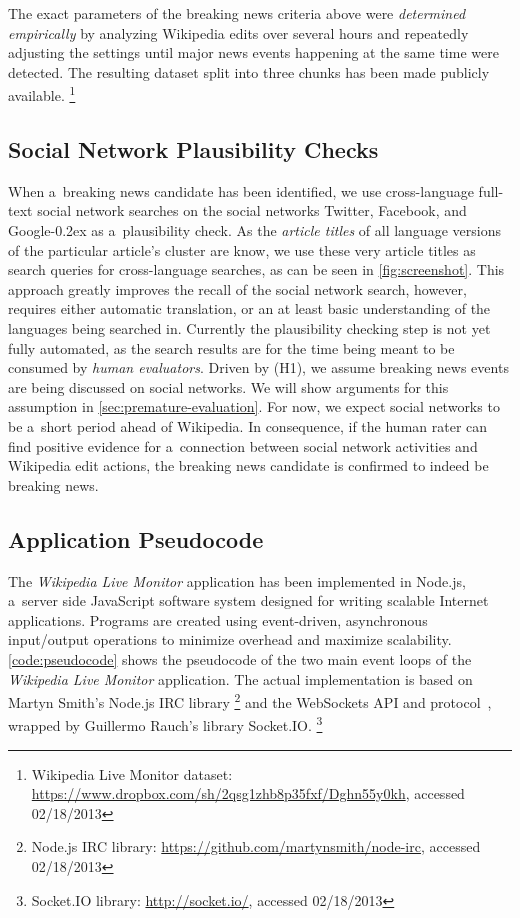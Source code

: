 \documentclass{www13-companion-accepted}
\DeclareRobustCommand{\googleplus}{\mbox{Google\hspace{0em}\raisebox{.28ex}{\tiny\bf +}\kern-0.2ex}\xspace}
\newcommand{\inlinelistingsize}{\fontsize{8pt}{11pt}}
\let\oldurl\url
\renewcommand{\url}[1]{\inlinelistingsize\oldurl{#1}}
\begin{document}
The exact parameters of the breaking news criteria above
were \emph{determined empirically} by analyzing Wikipedia edits
over several hours and repeatedly adjusting the settings until
major news events happening at the same time were detected.
The resulting dataset split into three chunks has been made publicly available.%
\footnote{Wikipedia Live Monitor dataset: \url{https://www.dropbox.com/sh/2qsg1zhb8p35fxf/Dghn55y0kh},
accessed 02/18/2013}

\subsection{Social Network Plausibility Checks}

When a~breaking news candidate has been identified,
we use cross-language full-text social network searches
on the social networks Twitter, Facebook, and \googleplus
as a~plausibility check.
As the \emph{article titles} of all language versions
of the particular article's cluster are know,
we use these very article titles as search queries for cross-language searches,
as can be seen in \autoref{fig:screenshot}.
This approach greatly improves the recall of the social network search,
however, requires either automatic translation, or an at least basic understanding
of the languages being searched in.
Currently the plausibility checking step is not yet fully automated,
as the search results are for the time being meant to be consumed by \emph{human evaluators}.
Driven by (H1), we assume breaking news events are being discussed on social networks.
We will show arguments for this assumption in \autoref{sec:premature-evaluation}.
For now, we expect social networks to be a~short period ahead of Wikipedia.
In consequence, if the human rater can find positive evidence
for a~connection between social network activities and Wikipedia edit actions,
the breaking news candidate is confirmed to indeed be breaking news.

\subsection{Application Pseudocode}

The \emph{Wikipedia Live Monitor} application has been implemented in Node.js,
a~server side JavaScript software system
designed for writing scalable Internet applications.
Programs are created using event-driven, asynchronous input/output operations
to minimize overhead and maximize scalability.
\autoref{code:pseudocode} shows the pseudocode of the two main event loops of the
\emph{Wikipedia Live Monitor} application.
The actual implementation is based on
Martyn Smith's Node.js IRC library%
\footnote{Node.js IRC library: \url{https://github.com/martynsmith/node-irc},
accessed 02/18/2013} and
the WebSockets API and protocol~\cite{hickson2012websockets},
wrapped by  Guillermo Rauch's library Socket.IO.%
\footnote{Socket.IO library: \url{http://socket.io/},
accessed 02/18/2013}
\end{document}
